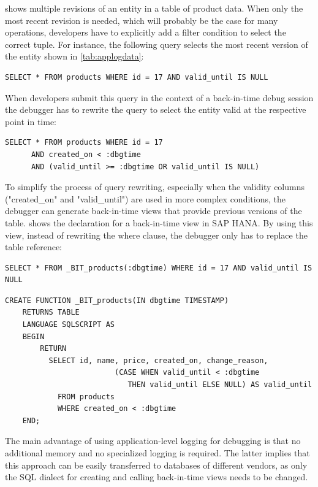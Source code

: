  shows multiple revisions of an entity in a table of product data. 
When only the most recent revision is needed, which will probably be the case for many operations, developers have to explicitly add a filter condition to select the correct tuple.
For instance, the following query selects the most recent version of the entity shown in \cref{tab:applogdata}:
\begin{lstlisting}[language=HanaSQL,frame={},numbers=none]
  SELECT * FROM products WHERE id = 17 AND valid_until IS NULL
\end{lstlisting}
When developers submit this query in the context of a back-in-time debug session the debugger has to rewrite the query to select the entity valid at the respective point in time:
\begin{lstlisting}[language=HanaSQL,frame={},numbers=none]
  SELECT * FROM products WHERE id = 17 
	  AND created_on < :dbgtime 
	  AND (valid_until >= :dbgtime OR valid_until IS NULL)
\end{lstlisting}
To simplify the process of query rewriting, especially when the validity columns ("created\_on" and "valid\_until") are used in more complex conditions, the debugger can generate back-in-time views that provide previous versions of the table.
 shows the declaration for a back-in-time view in SAP HANA.
By using this view, instead of rewriting the where clause, the debugger only has to replace the table reference:
\begin{lstlisting}[language=HanaSQL,frame={},numbers=none]
  SELECT * FROM _BIT_products(:dbgtime) WHERE id = 17 AND valid_until IS NULL
\end{lstlisting}

\begin{lstlisting}[language=HanaSQL,float,caption={Definition statement for a parameterized view, showing a previous version of table "products", in SAP HANA's SQL dialect},label=lst:bitview,firstnumber=1,stepnumber=5]
	CREATE FUNCTION _BIT_products(IN dbgtime TIMESTAMP)
	RETURNS TABLE 
	LANGUAGE SQLSCRIPT AS
	BEGIN
		RETURN 
		  SELECT id, name, price, created_on, change_reason,
						 (CASE WHEN valid_until < :dbgtime 
							THEN valid_until ELSE NULL) AS valid_until
			FROM products 
			WHERE created_on < :dbgtime
	END;
\end{lstlisting}


The main advantage of using application-level logging for debugging is that no additional memory and no specialized logging is required.
The latter implies that this approach can be easily transferred to databases of different vendors, as only the SQL dialect for creating and calling back-in-time views needs to be changed.


